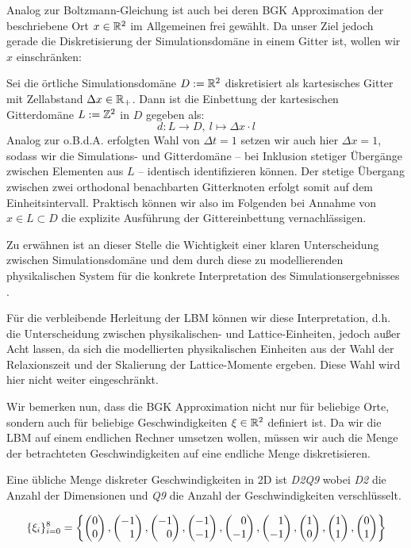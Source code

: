 Analog zur Boltzmann-Gleichung ist auch bei deren BGK Approximation der beschriebene Ort \(x \in \mathbb{R}^2\) im Allgemeinen frei gewählt. Da unser Ziel jedoch gerade die Diskretisierung der Simulationsdomäne in einem Gitter ist, wollen wir \(x\) einschränken:

\begin{Definition}[Ortsdiskretisierung]
\label{def:SpatialDiscretizationLBM}
Sei die örtliche Simulationsdomäne \(D := \mathbb{R}^2\) diskretisiert als kartesisches Gitter mit Zellabstand \(\Delta x \in \mathbb{R}_+\). Dann ist die Einbettung der kartesischen Gitterdomäne \(L := \mathbb{Z}^2\) in \(D\) gegeben als:
\[d : L \to D, \ l \mapsto \Delta x \cdot l\]
Analog zur o.B.d.A. erfolgten Wahl von \(\Delta t = 1\) setzen wir auch hier \(\Delta x = 1\), sodass wir die Simulations- und Gitterdomäne -- bei Inklusion stetiger Übergänge zwischen Elementen aus \(L\) -- identisch identifizieren können. Der stetige Übergang zwischen zwei orthodonal benachbarten Gitterknoten erfolgt somit auf dem Einheitsintervall. Praktisch können wir also im Folgenden bei Annahme von \(x \in L \subset D\) die explizite Ausführung der Gittereinbettung vernachlässigen.
\end{Definition}

Zu erwähnen ist an dieser Stelle die Wichtigkeit einer klaren Unterscheidung zwischen Simulationsdomäne und dem durch diese zu modellierenden physikalischen System für die konkrete Interpretation des Simulationsergebnisses \cite[Kap.~7]{krueger17}.

Für die verbleibende Herleitung der LBM können wir diese Interpretation, d.h. die Unterscheidung zwischen physikalischen- und Lattice-Einheiten, jedoch außer Acht lassen, da sich die modellierten physikalischen Einheiten aus der Wahl der Relaxionszeit und der Skalierung der Lattice-Momente ergeben. Diese Wahl wird hier nicht weiter eingeschränkt.

\bigskip

Wir bemerken nun, dass die BGK Approximation nicht nur für beliebige Orte, sondern auch für beliebige Geschwindigkeiten \(\xi \in \mathbb{R}^2\) definiert ist. Da wir die LBM auf einem endlichen Rechner umsetzen wollen, müssen wir auch die Menge der betrachteten Geschwindigkeiten auf eine endliche Menge diskretisieren.

Eine übliche Menge diskreter Geschwindigkeiten in 2D ist \emph{D2Q9} wobei \emph{D2} die Anzahl der Dimensionen und \emph{Q9} die Anzahl der Geschwindigkeiten verschlüsselt.

\begin{Definition}[D2Q9 Modell]
\[ \{\xi_i\}_{i=0}^8 = \left\{ \begin{pmatrix}0\\0\end{pmatrix}, \begin{pmatrix}-1\\\phantom{-}1\end{pmatrix}, \begin{pmatrix}-1\\\phantom{-}0\end{pmatrix}, \begin{pmatrix}-1\\-1\end{pmatrix}, \begin{pmatrix}\phantom{-}0\\-1\end{pmatrix}, \begin{pmatrix}\phantom{-}1\\-1\end{pmatrix}, \begin{pmatrix}1\\0\end{pmatrix}, \begin{pmatrix}1\\1\end{pmatrix}, \begin{pmatrix}0\\1\end{pmatrix} \right\} \]
\end{Definition}

